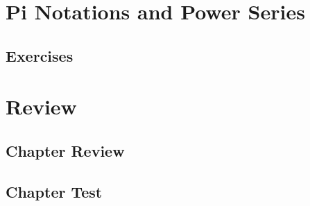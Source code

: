 \section{Pi Notations and Power Series}
\noindent{}
\subsection{Exercises}


\section{Review}
\subsection{Chapter Review}
\subsection{Chapter Test}